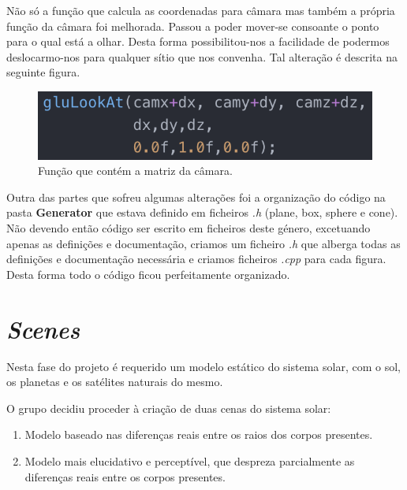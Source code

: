 \documentclass[a4paper]{article}
\begin{document}
Não só a função que calcula as coordenadas para câmara mas também a própria função da câmara foi melhorada. Passou a poder mover-se consoante o ponto para o qual está a olhar. Desta forma possibilitou-nos a facilidade de podermos deslocarmo-nos para qualquer sítio que nos convenha. Tal alteração é descrita na seguinte figura.

\begin{figure}[H]
\centering
\includegraphics[scale=0.9]{mat_camara.png}
\caption{Função que contém a matriz da câmara.}
\label{img:mat_camara}
\end{figure}

Outra das partes que sofreu algumas alterações foi a organização do código na pasta \textbf{Generator} que estava definido em ficheiros \emph{.h} (plane, box, sphere e cone). Não devendo então código ser escrito em ficheiros deste género, excetuando apenas as definições e documentação, criamos um ficheiro \emph{.h} que alberga todas as definições e documentação necessária e criamos ficheiros \emph{.cpp} para cada figura. Desta forma todo o código ficou perfeitamente organizado.


\newpage

\section{\textit{Scenes}}

Nesta fase do projeto é requerido um modelo estático do sistema solar, com o sol, os planetas e os satélites naturais do mesmo.

  \vspace{0.5cm}

O grupo decidiu proceder à criação de duas cenas do sistema solar:

\begin{enumerate}
\item Modelo baseado nas diferenças reais entre os raios dos corpos presentes.
\item Modelo mais elucidativo e perceptível, que despreza parcialmente as diferenças reais entre os corpos presentes.
\end{enumerate}

  \vspace{0.5cm}
\end{document}
